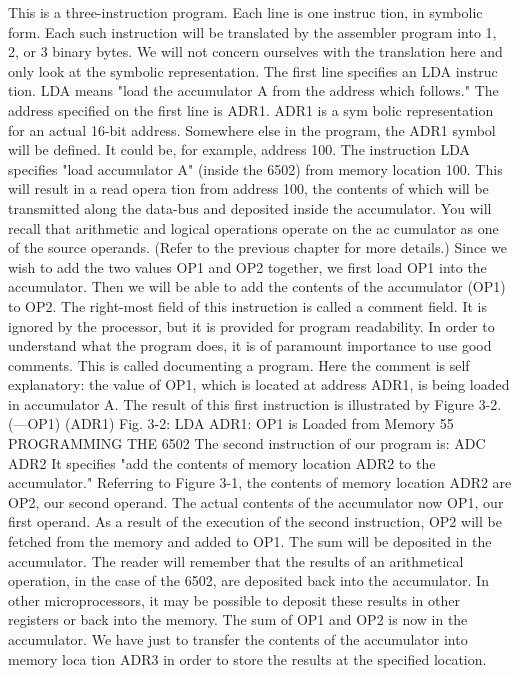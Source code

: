 \documentclass{book}
\begin{document}
This is a three-instruction program. Each line is one instruc
tion, in symbolic form. Each such instruction will be translated by
the assembler program into 1, 2, or 3 binary bytes. We will not
concern ourselves with the translation here and only look at the
symbolic representation. The first line specifies an LDA instruc
tion. LDA means "load the accumulator A from the address which
follows."
The address specified on the first line is ADR1. ADR1 is a sym
bolic representation for an actual 16-bit address. Somewhere else
in the program, the ADR1 symbol will be defined. It could be, for
example, address 100.
The instruction LDA specifies "load accumulator A" (inside the
6502) from memory location 100. This will result in a read opera
tion from address 100, the contents of which will be transmitted
along the data-bus and deposited inside the accumulator. You
will recall that arithmetic and logical operations operate on the ac
cumulator as one of the source operands. (Refer to the previous
chapter for more details.) Since we wish to add the two values
OP1 and OP2 together, we first load OP1 into the accumulator.
Then we will be able to add the contents of the accumulator (OP1)
to OP2.
The right-most field of this instruction is called a comment field.
It is ignored by the processor, but it is provided for program
readability. In order to understand what the program does, it is of
paramount importance to use good comments.
This is called documenting a program. Here the comment is self
explanatory: the value of OP1, which is located at address ADR1,
is being loaded in accumulator A.
The result of this first instruction is illustrated by Figure 3-2.
(—OP1)
(ADR1)
Fig. 3-2: LDA ADR1: OP1 is Loaded from Memory
55
PROGRAMMING THE 6502
The second instruction of our program is:
ADC ADR2
It specifies "add the contents of memory location ADR2 to the
accumulator." Referring to Figure 3-1, the contents of memory
location ADR2 are OP2, our second operand. The actual contents of
the accumulator now OP1, our first operand. As a result of the
execution of the second instruction, OP2 will be fetched from the
memory and added to OP1. The sum will be deposited in the
accumulator. The reader will remember that the results of an
arithmetical operation, in the case of the 6502, are deposited back
into the accumulator. In other microprocessors, it may be possible
to deposit these results in other registers or back into the memory.
The sum of OP1 and OP2 is now in the accumulator. We have
just to transfer the contents of the accumulator into memory loca
tion ADR3 in order to store the results at the specified location.
\end{document}
